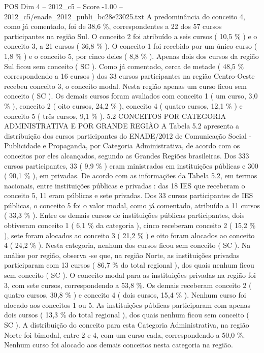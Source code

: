 \begin{textsample}{POS Dim 4 – 2012\_c5 – Score -1.00 – 2012\_c5/enade\_2012\_publi\_bc28e23025.txt}
A predominância do conceito 4, como já comentado, foi de 38,6 \%, correspondentes a 22 dos 57 cursos participantes na região Sul.
O conceito 2 foi atribuído a seis cursos ( 10,5 \% ) e o conceito 3, a 21 cursos ( 36,8 \% ).
O conceito 1 foi recebido por um único curso ( 1,8 \% ) e o conceito 5, por cinco deles ( 8,8 \% ).
Apenas dois dos cursos da região Sul ficou sem conceito ( SC ).
Como já comentado, cerca de metade ( 48,5 \% correspondendo a 16 cursos ) dos 33 cursos participantes na região Centro-Oeste recebeu conceito 3, o conceito modal.
Nesta região apenas um curso ficou sem conceito ( SC ).
Os demais cursos foram avaliados com conceito 1 ( um curso, 3,0 \% ), conceito 2 ( oito cursos, 24,2 \% ), conceito 4 ( quatro cursos, 12,1 \% ) e conceito 5 ( três cursos, 9,1 \% ). 5.2 CONCEITOS POR CATEGORIA ADMINISTRATIVA E POR GRANDE REGIÃO A Tabela 5.2 apresenta a distribuição dos cursos participantes do ENADE/2012 de Comunicação Social - Publicidade e Propaganda, por Categoria Administrativa, de acordo com os conceitos por eles alcançados, segundo as Grandes Regiões brasileiras.
Dos 333 cursos participantes, 33 ( 9,9 \% ) eram ministrados em instituições públicas e 300 ( 90,1 \% ), em privadas.
De acordo com as informações da Tabela 5.2, em termos nacionais, entre instituições públicas e privadas : das 18 IES que receberam o conceito 5, 11 eram públicas e sete privadas.
Dos 33 cursos participantes de IES públicas, o conceito 5 foi o valor modal, como já comentado, atribuído a 11 cursos ( 33,3 \% ).
Entre os demais cursos de instituições públicas participantes, dois obtiveram conceito 1 ( 6,1 \% da categoria ), cinco receberam conceito 2 ( 15,2 \% ), sete foram alocados ao conceito 3 ( 21,2 \% ) e oito foram alocados ao conceito 4 ( 24,2 \% ).
Nesta categoria, nenhum dos cursos ficou sem conceito ( SC ).
Na análise por região, observa -se que, na região Norte, as instituições privadas participaram com 13 cursos ( 86,7 \% do total regional ), dos quais nenhum ficou sem conceito ( SC ).
O conceito modal para as instituições privadas na região foi 3, com sete cursos, correspondendo a 53,8 \%.
Os demais receberam conceito 2 ( quatro cursos, 30,8 \% ) e conceito 4 ( dois cursos, 15,4 \% ).
Nenhum curso foi alocado aos conceitos 1 ou 5.
As instituições públicas participaram com apenas dois cursos ( 13,3 \% do total regional ), dos quais nenhum ficou sem conceito ( SC ).
A distribuição do conceito para esta Categoria Administrativa, na região Norte foi bimodal, entre 2 e 4, com um curso cada, correspondendo a 50,0 \%.
Nenhum curso foi alocado aos demais conceitos nesta categoria na região.

\end{textsample}
